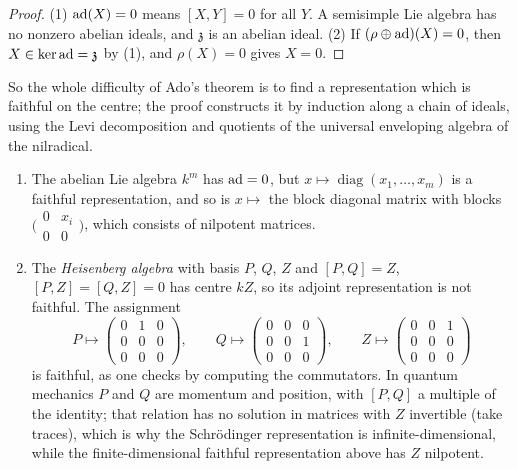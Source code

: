 \begin{proof}
(1) $\operatorname{ad}(X) = 0$ means $[X, Y] = 0$ for all $Y$. A semisimple Lie algebra has no nonzero abelian ideals, and $\mathfrak{z}$ is an abelian ideal. (2) If
$(\rho \oplus \operatorname{ad})(X) = 0$, then $X \in \ker\operatorname{ad} = \mathfrak{z}$ by (1), and $\rho(X) = 0$ gives $X = 0$.
\end{proof}

So the whole difficulty of Ado's theorem is to find a representation which is faithful on the centre; the proof constructs it by induction along a chain of ideals,
using the Levi decomposition and quotients of the universal enveloping algebra of the nilradical.

\begin{example}\label{lie-groups:example-ado}
\begin{enumerate}
\item The abelian Lie algebra $k^m$ has $\operatorname{ad} = 0$, but $x \mapsto \operatorname{diag}(x_1, \ldots, x_m)$ is a faithful representation, and so is $x \mapsto$ the
block diagonal matrix with blocks $\bigl(\begin{smallmatrix}0 & x_i\\ 0 & 0\end{smallmatrix}\bigr)$, which consists of nilpotent matrices.
\item The \emph{Heisenberg algebra} with basis $P$, $Q$, $Z$ and $[P, Q] = Z$, $[P, Z] = [Q, Z] = 0$ has centre $kZ$, so its adjoint representation is not faithful.
The assignment
\[
P \mapsto \begin{pmatrix}0 & 1 & 0\\ 0 & 0 & 0\\ 0 & 0 & 0\end{pmatrix}, \qquad Q \mapsto \begin{pmatrix}0 & 0 & 0\\ 0 & 0 & 1\\ 0 & 0 & 0\end{pmatrix}, \qquad Z \mapsto \begin{pmatrix}0 & 0 & 1\\ 0 & 0 & 0\\ 0 & 0 & 0\end{pmatrix}
\]
is faithful, as one checks by computing the commutators. In quantum mechanics $P$ and $Q$ are momentum and position, with $[P, Q]$ a multiple of the identity; that
relation has no solution in matrices with $Z$ invertible (take traces), which is why the Schr\"odinger representation is infinite-dimensional, while the
finite-dimensional faithful representation above has $Z$ nilpotent.

\end{enumerate}
\end{example}
